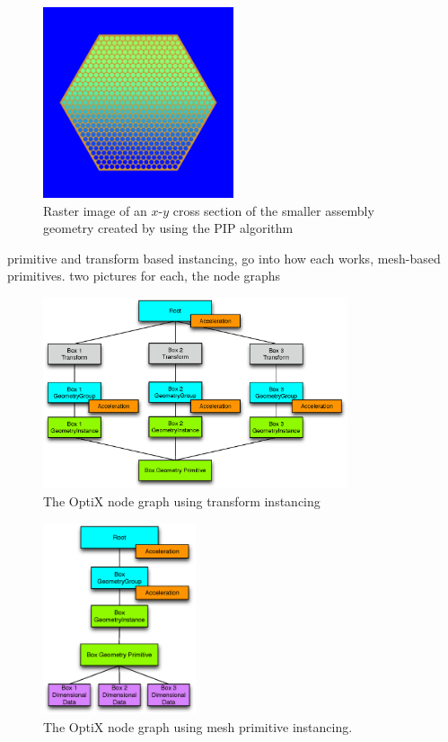 \begin{figure}[h!] 
  \centering
    \includegraphics[width=0.5\textwidth]{graphics/geom_test.png}
     \caption{Raster image of an $x$-$y$ cross section of the smaller assembly geometry created by using the PIP algorithm \label{raster_image} }
\end{figure}

primitive and transform based instancing, go into how each works, mesh-based primitives.  two pictures for each, the node graphs 

\begin{figure}[h!] 
  \centering
    \includegraphics[width=0.8\textwidth]{graphics/transform_instancing.eps}
     \caption{The OptiX node graph using transform instancing \label{transform_instancing} }
\end{figure}

\begin{figure}[h!] 
  \centering
    \includegraphics[width=0.4\textwidth]{graphics/primitive_instancing.eps}
     \caption{The OptiX node graph using mesh primitive instancing. \label{primitive_instancing} }
\end{figure}



